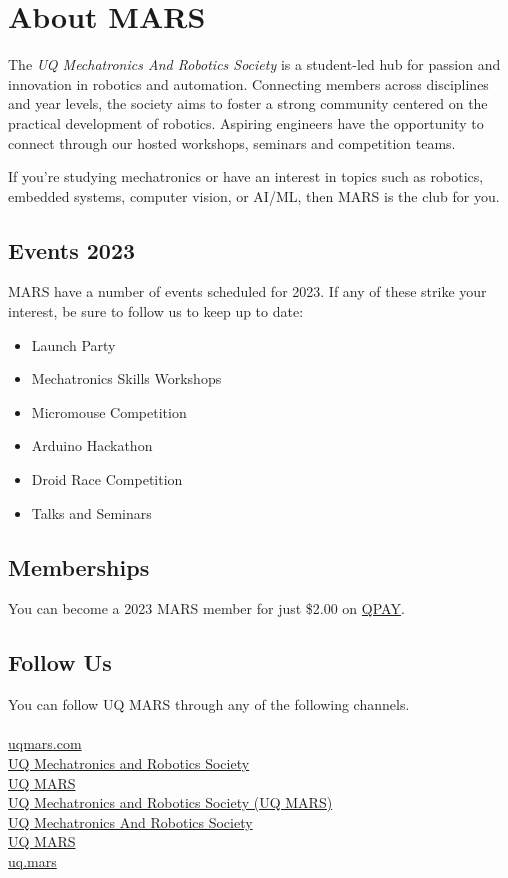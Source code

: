\chapter{About MARS}
The \textit{UQ Mechatronics And Robotics Society} is a student-led hub for passion and innovation in robotics and automation.
Connecting members across disciplines and year levels, the society aims to foster a strong community centered on the practical development of robotics.
Aspiring engineers have the opportunity to connect through our hosted workshops, seminars and competition teams.

If you're studying mechatronics or have an interest in topics such as robotics, embedded systems, computer vision, or AI/ML, then MARS is the club for you.

\section{Events 2023}
MARS have a number of events scheduled for 2023. If any of these strike your interest, be sure to follow us to keep up to date:
\begin{itemize}
    \item Launch Party
    \item Mechatronics Skills Workshops
    \item Micromouse Competition
    \item Arduino Hackathon
    \item Droid Race Competition
    \item Talks and Seminars
\end{itemize}

\section{Memberships}
You can become a 2023 MARS member for just \$2.00 on \href{https://uqmars.getqpay.com/}{QPAY}.

\section{Follow Us}
You can follow UQ MARS through any of the following channels. \\ \\
\faLink{} \href{https://www.uqmars.com}{uqmars.com} \\
\faDiscord{} \href{https://discord.gg/vjY49Q8}{UQ Mechatronics and Robotics Society} \\
\faFacebookSquare{} \href{https://facebook.com/UQMARS}{UQ MARS} \\
\faLinkedin{} \href{https://linkedin.com/company/uq-mars}{UQ Mechatronics and Robotics Society (UQ MARS)} \\
\faGithubSquare{} \href{https://github.com/uqmars}{UQ Mechatronics And Robotics Society} \\
\faYoutube{} \href{https://www.youtube.com/channel/UCH3GjoKLL3R_1ayjkn9C78A}{UQ MARS} \\
\faInstagram{} \href{https://www.instagram.com/uq.mars/}{uq.mars} \\
